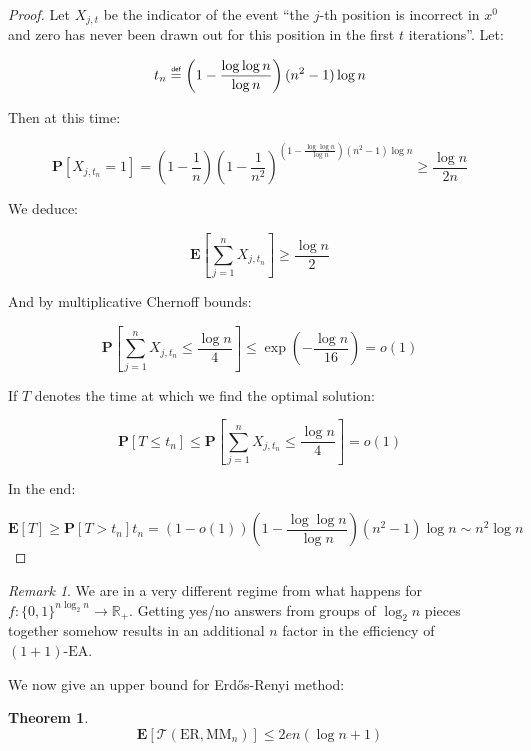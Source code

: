 \documentclass[12pt]{article}
\theoremstyle{definition}
\theoremstyle{plain}
\newtheorem*{theorem}{Theorem}
\theoremstyle{remark}
\newtheorem*{remark}{Remark}
\newcommand\mydef{\mathrel{\overset{\makebox[0pt]{\mbox{\normalfont\tiny\sffamily def}}}{=}}}
\begin{document}
\begin{proof}
    Let $X_{j,t}$ be the indicator of the event ``the $j$-th position is incorrect in $x^0$ and zero has
    never been drawn out for this position in the first $t$ iterations''. Let:

    $$t_n\mydef \left(1-\frac{\log \log n}{\log n}\right)(n^2-1)\log n$$

    Then at this time:

    $$\mathbf{P}[X_{j,t_n}=1]=
    \left(1-\frac{1}{n}\right)\left(1-\frac{1}{n^2}\right)^{\left(1-\frac{\log\log n}{\log n}\right)(n^2-1)\log n}\ge \frac{\log n}{2n}
    $$

    We deduce:

    $$\mathbf{E}\left[\sum_{j=1}^n X_{j,t_n}\right] \ge \frac{\log n}{2}$$

    And by multiplicative Chernoff bounds:

    $$\mathbf{P}\left[\sum_{j=1}^n X_{j,t_n}\le \frac{\log n}{4}\right] \le \exp\left(-\frac{\log n}{16}\right)=o(1)$$

    If $T$ denotes the time at which we find the optimal solution:

    $$\mathbf{P}[T\le t_n]\le \mathbf{P}\left[\sum_{j=1}^n X_{j,t_n} \le \frac{\log n}{4}\right]=o(1)$$

    In the end:

    $$\mathbf{E}[T]\ge \mathbf{P}[T>t_n] t_n=(1-o(1))\left(1-\frac{\log \log n}{\log n}\right)(n^2-1)\log n\sim n^2\log n$$\qedhere
\end{proof}

\begin{remark}
    We are in a very different regime from what happens for $f:\{0,1\}^{n \log_2 n}\to \mathbb{R}_+$. Getting yes/no
    answers from groups of $\log_2 n$ pieces together somehow results in an additional $n$ factor in the efficiency of $(1+1)\text{-EA}$.
\end{remark}

We now give an upper bound for Erd\H{o}s-Renyi method:

\begin{theorem}
    $$\mathbf{E}[\mathcal{T}(\text{ER}, \text{MM}_n)]\le 2en(\log n+1)$$
\end{theorem}
\end{document}
